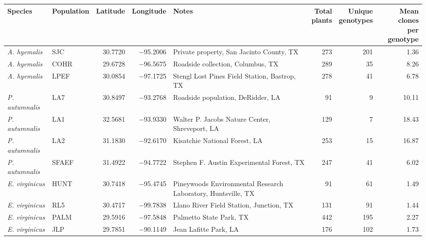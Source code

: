 \begin{tabular}{@{}ll
                r r
                >{\raggedright\arraybackslash}p{4.4cm}
                r r r@{}}
  \hline
Species & Population & Latitude & Longitude & Notes &
  \shortstack[r]{Total\\plants} &
  \shortstack[r]{Unique\\genotypes} &
  \shortstack[r]{Mean clones\\per genotype} \\
  \hline
\textit{A. hyemalis}   & SJC   & 30.7720 & $-$95.2006 & Private property, San Jacinto County, TX & 273 & 201 & 1.36 \\
\textit{A. hyemalis}   & COHR  & 29.6728 & $-$96.5675 & Roadside collection, Columbus, TX & 289 & 35 & 8.26 \\
\textit{A. hyemalis}   & LPEF  & 30.0854 & $-$97.1725 & Stengl Lost Pines Field Station, Bastrop, TX & 278 & 41 & 6.78 \\
\textit{P. autumnalis} & LA7   & 30.8497 & $-$93.2768 & Roadside population, DeRidder, LA & 91 & 9 & 10.11 \\
\textit{P. autumnalis} & LA1   & 32.5681 & $-$93.9330 & Walter P. Jacobs Nature Center, Shreveport, LA & 129 & 7 & 18.43 \\
\textit{P. autumnalis} & LA2   & 31.1830 & $-$92.6170 & Kisatchie National Forest, LA & 253 & 15 & 16.87 \\
\textit{P. autumnalis} & SFAEF & 31.4922 & $-$94.7722 & Stephen F. Austin Experimental Forest, TX & 247 & 41 & 6.02 \\
\textit{E. virginicus} & HUNT  & 30.7418 & $-$95.4745 & Pineywoods Environmental Research Laboratory, Huntsville, TX & 91 & 61 & 1.49 \\
\textit{E. virginicus} & RL5   & 30.4717 & $-$99.7838 & Llano River Field Station, Junction, TX & 131 & 91 & 1.44 \\
\textit{E. virginicus} & PALM  & 29.5916 & $-$97.5848 & Palmetto State Park, TX & 442 & 195 & 2.27 \\
\textit{E. virginicus} & JLP   & 29.7851 & $-$90.1149 & Jean Lafitte Park, LA & 176 & 102 & 1.73 \\
  \hline
\end{tabular}